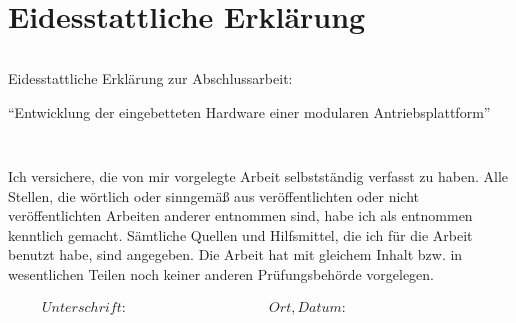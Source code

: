 \section*{Eidesstattliche Erklärung}
\thispagestyle{empty}

\begin{verbatim}

\end{verbatim}

\begin{Large}
	
	Eidesstattliche Erklärung zur Abschlussarbeit:
	
	\enquote{Entwicklung der eingebetteten Hardware einer modularen Antriebsplattform}
	
\end{Large}

\begin{verbatim}


\end{verbatim}
Ich versichere, die von mir vorgelegte Arbeit selbstständig verfasst zu haben. Alle Stellen, die wörtlich oder sinngemäß aus veröffentlichten oder nicht veröffentlichten Arbeiten anderer entnommen sind, habe ich als entnommen kenntlich gemacht. Sämtliche Quellen und Hilfsmittel, die ich für die Arbeit benutzt habe, sind angegeben. Die Arbeit hat mit gleichem Inhalt bzw. in wesentlichen Teilen noch keiner anderen Prüfungsbehörde vorgelegen.



\begin{displaymath}
\begin{array}{ll}
Unterschrift:~~~~~~~~~~~~~~~~~~~~~~~~~~~~~~~~~~~~~~~~~~
& Ort, Datum:~~~~~~~~~~~~~~~~~~~~~~~~~~~~~~~~~~~~~~~~~~
\end{array}
\end{displaymath}
